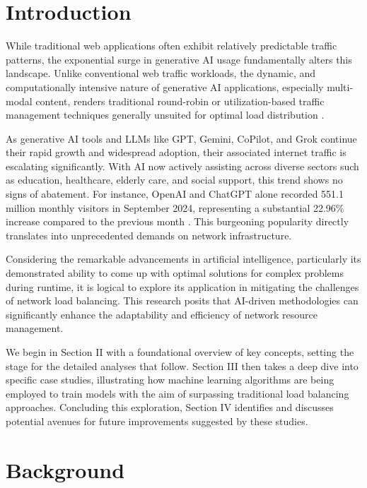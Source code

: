 \documentclass[conference]{IEEEtran}
\begin{document}
\section{Introduction}

While traditional web applications often exhibit relatively predictable traffic patterns, the exponential surge in generative AI usage fundamentally alters this landscape. Unlike conventional web traffic workloads, the dynamic, and computationally intensive nature of generative AI applications, especially multi-modal content, renders traditional round-robin or utilization-based traffic management techniques generally unsuited for optimal load distribution \cite{Berenberg_Sambi_2024}.

As generative AI tools and LLMs like GPT, Gemini, CoPilot, and Grok continue their rapid growth and widespread adoption, their associated internet traffic is escalating significantly. With AI now actively assisting across diverse sectors such as education, healthcare, elderly care, and social support, this trend shows no signs of abatement. For instance, OpenAI and ChatGPT alone recorded 551.1 million monthly visitors in September 2024, representing a substantial 22.96\% increase compared to the previous month \cite{Koneva_2025}. This burgeoning popularity directly translates into unprecedented demands on network infrastructure.

Considering the remarkable advancements in artificial intelligence, particularly its demonstrated ability to come up with optimal solutions for complex problems during runtime, it is logical to explore its application in mitigating the challenges of network load balancing. This research posits that AI-driven methodologies can significantly enhance the adaptability and efficiency of network resource management.

We begin in Section II with a foundational overview of key concepts, setting the stage for the detailed analyses that follow. Section III then takes a deep dive into specific case studies, illustrating how machine learning algorithms are being employed to train models with the aim of surpassing traditional load balancing approaches. Concluding this exploration, Section IV identifies and discusses potential avenues for future improvements suggested by these studies.

\section{Background}
\end{document}
